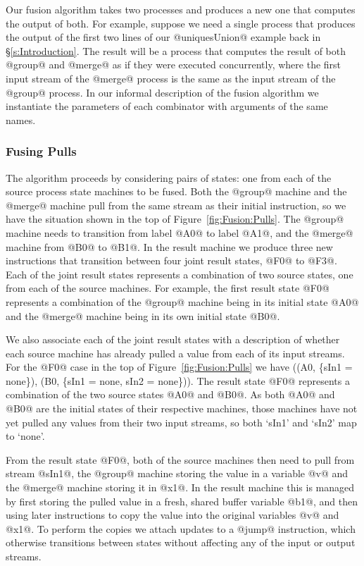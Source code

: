 Our fusion algorithm takes two processes and produces a new one that computes the output of both. For example, suppose we need a single process that produces the output of the first two lines of our @uniquesUnion@ example back in \S\ref{s:Introduction}. The result will be a process that computes the result of both @group@ and @merge@ as if they were executed concurrently, where the first input stream of the @merge@ process is the same as the input stream of the @group@ process. In our informal description of the fusion algorithm we instantiate the parameters of each combinator with arguments of the same names.

\subsubsection{Fusing Pulls}
\label{s:Fusion:FusingPulls}

The algorithm proceeds by considering pairs of states: one from each of the source process state machines to be fused. Both the @group@ machine and the @merge@ machine pull from the same stream as their initial instruction, so we have the situation shown in the top of Figure~\ref{fig:Fusion:Pulls}. The @group@ machine needs to transition from label @A0@ to label @A1@, and the @merge@ machine from @B0@ to @B1@. In the result machine we produce three new instructions that transition between four joint result states, @F0@ to @F3@.
Each of the joint result states represents a combination of two source states, one from each of the source machines. For example, the first result state @F0@ represents a combination of the @group@ machine being in its initial state @A0@ and the @merge@ machine being in its own initial state @B0@. 

We also associate each of the joint result states with a description of whether each source machine has already pulled a value from each of its input streams. For the @F0@ case in the top of Figure~\ref{fig:Fusion:Pulls} we have ((A0, \{sIn1 = none\}), (B0, \{sIn1 = none, sIn2 = none\})). The result state @F0@ represents a combination of the two source states @A0@ and @B0@. As both @A0@ and @B0@ are the initial states of their respective machines, those machines have not yet pulled any values from their two input streams, so both `sIn1' and `sIn2' map to `none'.

From the result state @F0@, both of the source machines then need to pull from stream @sIn1@, the @group@ machine storing the value in a variable @v@ and the @merge@ machine storing it in @x1@. In the result machine this is managed by first storing the pulled value in a fresh, shared buffer variable @b1@, and then using later instructions to copy the value into the original variables @v@ and @x1@. To perform the copies we attach updates to a @jump@ instruction, which otherwise transitions between states without affecting any of the input or output streams.

